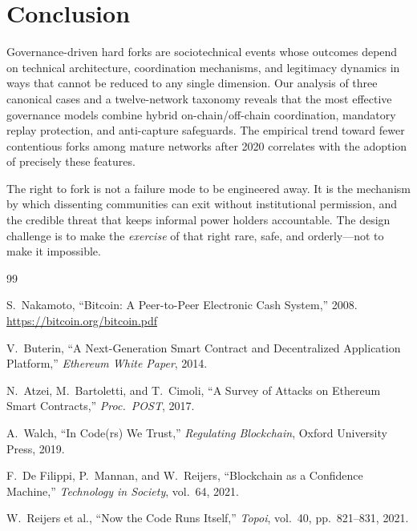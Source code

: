\documentclass[sigconf,nonacm]{acmart}
\begin{document}
{%
\section{Conclusion}

Governance-driven hard forks are sociotechnical events whose outcomes depend on technical
architecture, coordination mechanisms, and legitimacy dynamics in ways that cannot be
reduced to any single dimension. Our analysis of three canonical cases and a twelve-network
taxonomy reveals that the most effective governance models combine hybrid on-chain/off-chain
coordination, mandatory replay protection, and anti-capture safeguards. The empirical trend
toward fewer contentious forks among mature networks after 2020 correlates with the adoption
of precisely these features.

The right to fork is not a failure mode to be engineered away. It is the mechanism by which
dissenting communities can exit without institutional permission, and the credible threat
that keeps informal power holders accountable. The design challenge is to make the
\emph{exercise} of that right rare, safe, and orderly---not to make it impossible.

\sloppy

\begin{thebibliography}{99}

S.~Nakamoto, ``Bitcoin: A Peer-to-Peer Electronic Cash System,'' 2008.
\url{https://bitcoin.org/bitcoin.pdf}

V.~Buterin, ``A Next-Generation Smart Contract and Decentralized Application Platform,''
\emph{Ethereum White Paper}, 2014.

N.~Atzei, M.~Bartoletti, and T.~Cimoli, ``A Survey of Attacks on Ethereum Smart
Contracts,'' \emph{Proc.\ POST}, 2017.

A.~Walch, ``In Code(rs) We Trust,'' \emph{Regulating Blockchain}, Oxford University
Press, 2019.

F.~De Filippi, P.~Mannan, and W.~Reijers, ``Blockchain as a Confidence Machine,''
\emph{Technology in Society}, vol.~64, 2021.

W.~Reijers et al., ``Now the Code Runs Itself,'' \emph{Topoi}, vol.~40,
pp.~821--831, 2021.


\end{thebibliography}}
\end{document}
